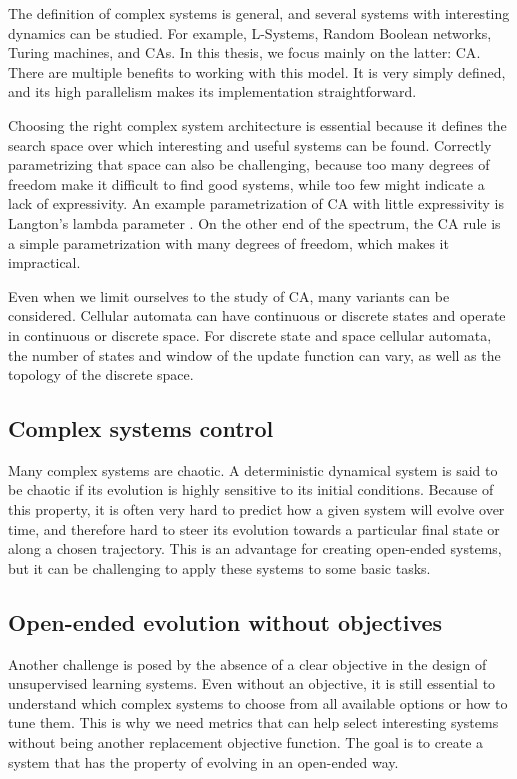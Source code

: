 The definition of complex systems is general, and several systems with
interesting dynamics can be studied. For example, L-Systems, Random Boolean
networks, Turing machines, and \Acfp{CA}. In this thesis, we focus mainly on
the latter: \ac{CA}. There are multiple benefits to working with this model. It
is very simply defined, and its high parallelism makes its implementation straightforward.

Choosing the right complex system architecture is essential because it defines
the search space over which interesting and useful systems can be found.
Correctly parametrizing that space can also be challenging, because too many
degrees of freedom make it difficult to find good systems, while too few might
indicate a lack of expressivity. An example parametrization of \ac{CA} with
little expressivity is Langton's lambda parameter
\parencite{langton_computation_1990}. On the other end of the spectrum, the
\ac{CA} rule is a simple parametrization with many degrees of freedom, which makes it
impractical.

Even when we limit ourselves to the study of \ac{CA}, many variants
can be considered. Cellular automata can have continuous or discrete states and operate in continuous or discrete space. For discrete state and space cellular
automata, the number of states and window of the update function can vary, as
well as the topology of the discrete space.


\subsection{Complex systems control}\label{sec:compl-syst-contr}

Many complex systems are chaotic. A deterministic dynamical system is said to be
chaotic if its evolution is highly sensitive to its initial conditions. Because
of this property, it is often very hard to predict how a given system will
evolve over time, and therefore hard to steer its evolution towards a particular
final state or along a chosen trajectory. This is an advantage for creating
open-ended systems, but it can be challenging to apply these systems to some
basic tasks.

\subsection{Open-ended evolution without
  objectives}\label{sec:open-ended-evolution}

Another challenge is posed by the absence of a clear objective in the design of
unsupervised learning systems. Even without an objective, it is still essential
to understand which complex systems to choose from all available options or how
to tune them. This is why we need metrics that can help select interesting
systems without being another replacement objective function. The goal is to
create a system that has the property of evolving in an open-ended way.

